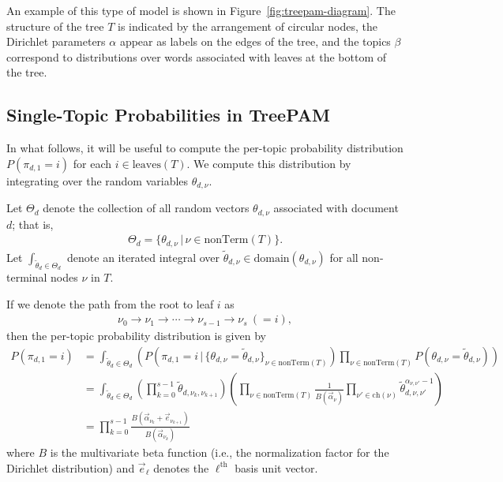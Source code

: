\documentclass{article}
\theoremstyle{definition}
\newcommand{\nth}{^{\text{th}}}
\newcommand{\leaves}{\text{leaves}}
\newcommand{\nonTerm}{\text{nonTerm}}
\newcommand{\domain}{\text{domain}}
\begin{document}
An example of this type of model is shown in Figure~\ref{fig:treepam-diagram}.
The structure of the tree $T$ is indicated by the arrangement of circular nodes, the Dirichlet parameters $\alpha$ appear as labels on the edges of the tree, and the topics $\beta$ correspond to distributions over words associated with leaves at the bottom of the tree.

\subsection{Single-Topic Probabilities in TreePAM}
\label{sec:single-topic-probabilities}

In what follows, it will be useful to compute the per-topic probability distribution $P(\pi_{d,1} = i)$ for each $i \in \leaves(T)$.
We compute this distribution by integrating over the random variables $\theta_{d,\nu}$.

Let $\Theta_d$ denote the collection of all random vectors $\theta_{d,\nu}$ associated with document $d$; that is,
\begin{align*}
\Theta_d = \{\theta_{d,\nu} \, | \, \nu \in \nonTerm(T) \}.
\end{align*}
Let $\int_{\tilde \theta_d \in \Theta_d}$ denote an iterated integral over $\tilde \theta_{d,\nu} \in \domain(\theta_{d,\nu})$ for all non-terminal nodes $\nu$ in $T$.

If we denote the path from the root to leaf $i$ as
\begin{align*}
\nu_0 \to \nu_1 \to \cdots \to \nu_{s-1} \to \nu_s \ (=i),
\end{align*}
then the per-topic probability distribution is given by
\begin{align*}
P(\pi_{d,1} = i)
&=
\int_{\tilde \theta_d \in \Theta_d}
  \left(
  P\left(\pi_{d,1}=i \,|\, \{ \theta_{d,\nu} = \tilde \theta_{d,\nu} \}_{\nu \in \nonTerm(T)}\right)
  \prod_{\nu \in \nonTerm(T)} P\left(\theta_{d,\nu} = \tilde \theta_{d,\nu}\right)
  \right)
\\
&=
\int_{\tilde \theta_d \in \Theta_d}
  \left(
  \prod_{k=0}^{s-1} \tilde \theta_{d,\nu_k,\nu_{k+1}}
  \right)
  \left(
  \prod_{\nu \in \nonTerm(T)}
  \frac{1}{B(\vec\alpha_\nu)}
  \prod_{\nu' \in \text{ch}(\nu)}
  \tilde \theta_{d,\nu,\nu'}^{\alpha_{\nu,\nu'}-1}
  \right)
\\
&=
\prod_{k=0}^{s-1}
  \frac{B(\vec\alpha_{\nu_k} + \vec e_{\nu_{k+1}})}
       {B(\vec\alpha_{\nu_k})}
\end{align*}
where $B$ is the multivariate beta function (i.e., the normalization factor for the Dirichlet distribution) and $\vec e_\ell$ denotes the $\ell\nth$ basis unit vector.
\end{document}

